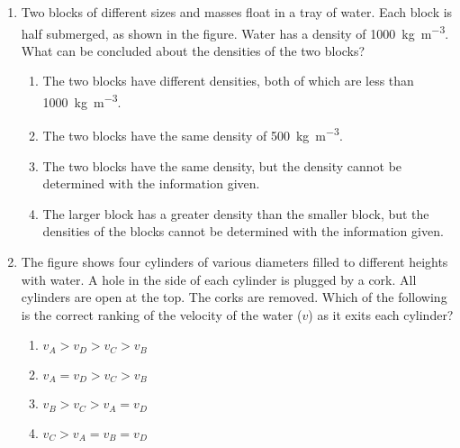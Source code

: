 \documentclass{../../../oss-classkick}
\begin{document}
\genheader


\genmultidirections

\gengravity

\raggedcolumns
\begin{multicols}{2}

  \begin{enumerate}[leftmargin=18pt]

  \item Two blocks of different sizes and masses float in a tray of water. Each
    block is half submerged, as shown in the figure. Water has a density of
    \SI{1000}{\kilo\gram\per\metre\cubed}. What can be concluded about the
    densities of the two blocks?
    
    \begin{enumerate}[nosep,leftmargin=18pt,label=(\Alph*)]
    \item\vspace{-.1in} The two blocks have different densities, both of which
      are less than \SI{1000}{\kilo\gram\per\metre\cubed}.
    \item The two blocks have the same density of
      \SI{500}{\kilo\gram\per\metre\cubed}.
    \item The two blocks have the same density, but the density cannot be
      determined with the information given.
    \item The larger block has a greater density than the smaller block, but
      the densities of the blocks cannot be determined with the information
      given.
    \end{enumerate}
    \vspace{.65in}
    
  \item The figure shows four cylinders of various diameters filled to different
    heights with water. A hole in the side of each cylinder is plugged by a
    cork. All cylinders are open at the top. The corks are removed. Which
    of the following is the correct ranking of the velocity of the water ($v$)
    as it exits each cylinder?
    
    \begin{enumerate}[nosep,leftmargin=18pt,label=(\Alph*)]
    \item $v_A > v_D > v_C > v_B$
    \item $v_A = v_D > v_C > v_B$
    \item $v_B > v_C > v_A = v_D$
    \item $v_C > v_A = v_B = v_D$
    \end{enumerate}
    \vspace{.65in}


\end{enumerate}
\end{multicols}
\end{document}
